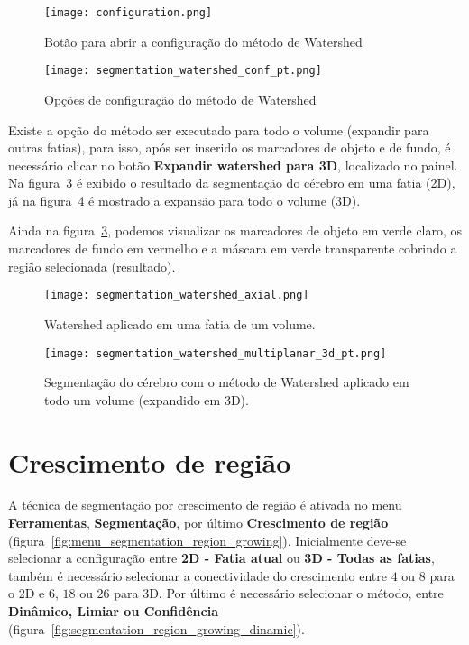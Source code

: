 \begin{figure}[!htb]
\centering
\texttt{[image: configuration.png]}
\caption{Botão para abrir a configuração do método de Watershed}
\label{fig:watershed_conf}
\end{figure}

\begin{figure}[!htb]
\centering
\texttt{[image: segmentation\_watershed\_conf\_pt.png]}
\caption{Opções de configuração do método de Watershed}
\label{fig:watershed_janela_conf}
\end{figure}

Existe a opção do método ser executado para todo o volume (expandir para outras fatias), para isso, após ser inserido os marcadores de objeto e de fundo, é necessário clicar no botão \textbf{Expandir watershed para 3D}, localizado no painel. Na figura~\ref{fig:watershed_2d} é exibido o resultado da segmentação do cérebro em uma fatia (2D), já na figura~\ref{fig:watershed_3d} é mostrado a expansão para todo o volume (3D). 

Ainda na figura~\ref{fig:watershed_2d}, podemos visualizar os marcadores de objeto em verde claro, os marcadores de fundo em vermelho e a máscara em verde transparente cobrindo a região selecionada (resultado).

\begin{figure}[!htb]
\centering
\texttt{[image: segmentation\_watershed\_axial.png]}
\caption{Watershed aplicado em uma fatia de um volume.}
\label{fig:watershed_2d}
\end{figure}

\begin{figure}[!htb]
\centering
\texttt{[image: segmentation\_watershed\_multiplanar\_3d\_pt.png]}
\caption{Segmentação do cérebro com o método de Watershed aplicado em todo um volume (expandido em 3D).}
\label{fig:watershed_3d}
\end{figure}

\section{Crescimento de região}

A técnica de segmentação por crescimento de região é ativada no menu \textbf{Ferramentas}, \textbf{Segmentação}, por último \textbf{Crescimento de região} (figura~\ref{fig:menu_segmentation_region_growing}). Inicialmente deve-se selecionar a configuração entre \textbf{2D - Fatia atual} ou \textbf{3D - Todas as fatias}, também é necessário selecionar a conectividade do crescimento entre $4$ ou $8$ para o 2D e $6$, $18$ ou $26$ para 3D. Por último é necessário selecionar o método, entre \textbf{Dinâmico, Limiar ou Confidência} (figura~\ref{fig:segmentation_region_growing_dinamic}).

